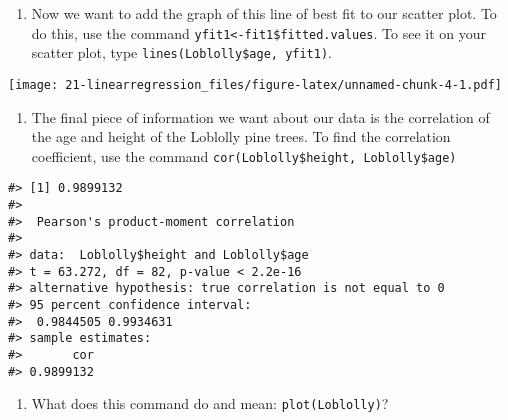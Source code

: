 \documentclass[
]{book}
\newenvironment{Shaded}{\begin{snugshade}}{\end{snugshade}}
\newcommand{\CommentTok}[1]{\textcolor[rgb]{0.56,0.35,0.01}{\textit{#1}}}
\newcommand{\FunctionTok}[1]{\textcolor[rgb]{0.00,0.00,0.00}{#1}}
\newcommand{\NormalTok}[1]{#1}
\newcommand{\OtherTok}[1]{\textcolor[rgb]{0.56,0.35,0.01}{#1}}
\newcommand{\SpecialCharTok}[1]{\textcolor[rgb]{0.00,0.00,0.00}{#1}}
\providecommand{\tightlist}{%
  \setlength{\itemsep}{0pt}\setlength{\parskip}{0pt}}
\begin{document}
\begin{Shaded}
\end{Shaded}

\begin{enumerate}
\def\labelenumi{\arabic{enumi}.}
\setcounter{enumi}{4}
\tightlist
\item
  Now we want to add the graph of this line of best fit to our scatter plot. To do this, use the
  command \texttt{yfit1\textless{}-fit1\$fitted.values}. To see it on your scatter plot, type \texttt{lines(Loblolly\$age,\ yfit1)}.
\end{enumerate}

\texttt{[image: 21-linearregression\_files/figure-latex/unnamed-chunk-4-1.pdf]}

\begin{enumerate}
\def\labelenumi{\arabic{enumi}.}
\setcounter{enumi}{8}
\tightlist
\item
  The final piece of information we want about our data is the correlation of the age and height
  of the Loblolly pine trees. To find the correlation coefficient, use the command \texttt{cor(Loblolly\$height,\ Loblolly\$age)}
\end{enumerate}

\begin{verbatim}
#> [1] 0.9899132
#> 
#>  Pearson's product-moment correlation
#> 
#> data:  Loblolly$height and Loblolly$age
#> t = 63.272, df = 82, p-value < 2.2e-16
#> alternative hypothesis: true correlation is not equal to 0
#> 95 percent confidence interval:
#>  0.9844505 0.9934631
#> sample estimates:
#>       cor 
#> 0.9899132
\end{verbatim}

\begin{enumerate}
\def\labelenumi{\arabic{enumi}.}
\setcounter{enumi}{9}
\tightlist
\item
  What does this command do and mean: \texttt{plot(Loblolly)}?
\end{enumerate}
\end{document}
